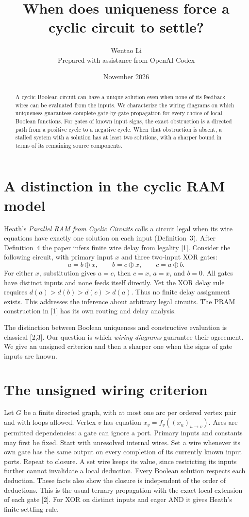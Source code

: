 \documentclass[11pt]{article}
\title{When does uniqueness force a cyclic circuit to settle?}
\author{Wentao Li\\[2pt]\small Prepared with assistance from OpenAI Codex}
\date{November 2026}
\begin{document}
\maketitle
\begin{abstract}
A cyclic Boolean circuit can have a unique solution even when none of its feedback wires can be evaluated from the inputs. We characterize the wiring diagrams on which uniqueness guarantees complete gate-by-gate propagation for every choice of local Boolean functions. For gates of known input signs, the exact obstruction is a directed path from a positive cycle to a negative cycle. When that obstruction is absent, a stalled system with a solution has at least two solutions, with a sharper bound in terms of its remaining source components.
\end{abstract}

\section{A distinction in the cyclic RAM model}
Heath's \emph{Parallel RAM from Cyclic Circuits} calls a circuit legal when its wire equations have exactly one solution on each input (Definition~3). After Definition~4 the paper infers finite wire delay from legality [1]. Consider the following circuit, with primary input $x$ and three two-input XOR gates:
\[
             a=b\oplus x,\qquad b=c\oplus x,\qquad c=a\oplus b.
\]
For either $x$, substitution gives $a=c$, then $c=x$, $a=x$, and $b=0$. All gates have distinct inputs and none feeds itself directly. Yet the XOR delay rule requires $d(a)>d(b)>d(c)>d(a)$. Thus no finite delay assignment exists. This addresses the inference about arbitrary legal circuits. The PRAM construction in [1] has its own routing and delay analysis.

The distinction between Boolean uniqueness and constructive evaluation is classical [2,3]. Our question is which \emph{wiring diagrams} guarantee their agreement. We give an unsigned criterion and then a sharper one when the signs of gate inputs are known.

\section{The unsigned wiring criterion}
Let $G$ be a finite directed graph, with at most one arc per ordered vertex pair and with loops allowed. Vertex $v$ has equation $x_v=f_v((x_u)_{u\to v})$. Arcs are permitted dependencies: a gate can ignore a port. Primary inputs and constants may first be fixed. Start with unresolved internal wires. Set a wire whenever its own gate has the same output on every completion of its currently known input ports. Repeat to closure. A set wire keeps its value, since restricting its inputs further cannot invalidate a local deduction. Every Boolean solution respects each deduction. These facts also show the closure is independent of the order of deductions. This is the usual ternary propagation with the exact local extension of each gate [2]. For XOR on distinct inputs and eager AND it gives Heath's finite-settling rule.
\end{document}
